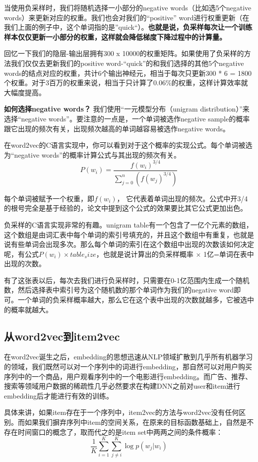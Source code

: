 \documentclass[12pt]{article}
\begin{document}
当使用负采样时，我们将随机选择一小部分的negative words（比如选5个negative words）来更新对应的权重。我们也会对我们的“positive” word进行权重更新（在我们上面的例子中，这个单词指的是”quick“）。\textbf{也就是说，负采样每次让一个训练样本仅仅更新一小部分的权重，这样就会降低梯度下降过程中的计算量。}

回忆一下我们的隐层-输出层拥有300 x 10000的权重矩阵。如果使用了负采样的方法我们仅仅去更新我们的positive word-“quick”的和我们选择的其他5个negative words的结点对应的权重，共计6个输出神经元，相当于每次只更新300 * 6 = 1800个权重。对于3百万的权重来说，相当于只计算了0.06\%的权重，这样计算效率就大幅度提高。

\textbf{如何选择negative words？}
我们使用“一元模型分布（unigram distribution）”来选择“negative words”。要注意的一点是，一个单词被选作negative sample的概率跟它出现的频次有关，出现频次越高的单词越容易被选作negative words。

在word2vec的C语言实现中，你可以看到对于这个概率的实现公式。每个单词被选为“negative words”的概率计算公式与其出现的频次有关。
$$
P(w_i) = \frac{f(w_i)^{3/4}}{\sum_{j=0}^n(f(w_j)^{3/4})}
$$

每个单词被赋予一个权重，即$f(w_i)$， 它代表着单词出现的频次。公式中开3/4的根号完全是基于经验的，论文中提到这个公式的效果要比其它公式更加出色。

负采样的C语言实现非常的有趣。unigram table有一个包含了一亿个元素的数组，这个数组是由词汇表中每个单词的索引号填充的，并且这个数组中有重复，也就是说有些单词会出现多次。那么每个单词的索引在这个数组中出现的次数该如何决定呢，有公式$P(w_i) \times table_size$，也就是说计算出的负采样概率 $\times $ 1亿=单词在表中出现的次数。

有了这张表以后，每次去我们进行负采样时，只需要在0-1亿范围内生成一个随机数，然后选择表中索引号为这个随机数的那个单词作为我们的negative word即可。一个单词的负采样概率越大，那么它在这个表中出现的次数就越多，它被选中的概率就越大。

\subsection{从word2vec到item2vec}
在word2vec诞生之后，embedding的思想迅速从NLP领域扩散到几乎所有机器学习的领域，我们既然可以对一个序列中的词进行embedding，那自然可以对用户购买序列中的一个商品，用户观看序列中的一个电影进行embedding。而广告、推荐、搜索等领域用户数据的稀疏性几乎必然要求在构建DNN之前对user和item进行embedding后才能进行有效的训练。

具体来讲，如果item存在于一个序列中，item2vec的方法与word2vec没有任何区别。而如果我们摒弃序列中item的空间关系，在原来的目标函数基础上，自然是不存在时间窗口的概念了，取而代之的是item set中两两之间的条件概率：
$$
\frac{1}{K}\sum_{i=1}^K\sum_{j \neq i}^K \log{p(w_j|w_i)}
$$
\end{document}
